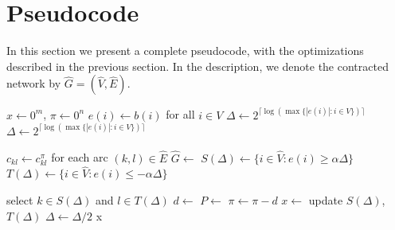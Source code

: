 \section{Pseudocode}
In this section we present a complete pseudocode, with the optimizations described in the previous section.
In the description, we denote the contracted network by $\hat{G} = (\hat{V}, \hat{E})$.
\begin{algorithm}[H]
\caption{\textsc{StronglyPolynomialCapacityScaling}$(G, b,c)$}
\label{alg:strongly_poly_capacity_scaling}
    \begin{algorithmic}[1]
        \State $x \gets 0^m$, $\pi \gets 0^n$
        \State $e(i) \gets b(i)$ for all $i \in V$
        \State $\Delta \gets 2^{\lceil\log( \max \{|e(i)| \colon i \in V\})\rceil}$
                \State $\Delta \gets 2^{\lceil\log( \max \{|e(i)| \colon i \in V\})\rceil}$
            \EndIf

             
                \State $c_{kl} \gets c^\pi_{kl}$ for each arc $(k,l) \in \hat{E}$
                \State $\hat{G} \gets$ 
            \EndWhile
            \State $S(\Delta) \gets \{i\in \hat{V} \colon e(i) \geq \alpha\Delta\}$
            \State $T(\Delta) \gets \{i\in \hat{V} \colon e(i) \leq -\alpha\Delta\}$

                \State select $k \in S(\Delta)$ and $l\in T(\Delta)$ 
                \State $d \gets$  
                \State $P \gets$    
                \State $\pi \gets \pi -d$
                \State $x \gets$  
                \State update $S(\Delta)$, $T(\Delta)$
            \EndWhile
            \State $\Delta \gets \Delta/2$
        \EndWhile
        \State {}
        \State \Return x
    \end{algorithmic}
\end{algorithm}

